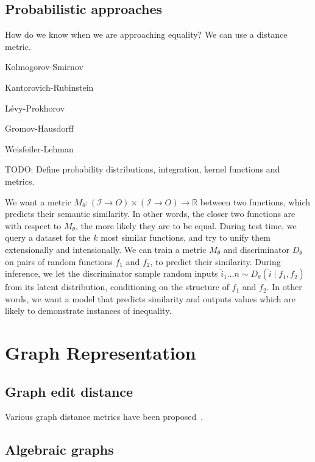 \documentclass[11pt]{article}
\begin{document}
    \subsection{Probabilistic approaches}

    How do we know when we are approaching equality? We can use a distance metric.

    Kolmogorov-Smirnov

    Kantorovich-Rubinstein

    L\'evy-Prokhorov

    Gromov-Hausdorff

    Weisfeiler-Lehman

    TODO: Define probability distributions, integration, kernel functions and metrics.

    We want a metric $M_\theta: (\mathcal{I}\rightarrow{O}) \times (\mathcal{I}\rightarrow{O})\rightarrow \mathbb{R}$ between two functions, which predicts their semantic similarity. In other words, the closer two functions are with respect to $M_\theta$, the more likely they are to be equal. During test time, we query a dataset for the $k$ most similar functions, and try to unify them extensionally and intensionally. We can train a metric $M_\theta$ and discriminator $D_\theta$ on pairs of random functions $f_1$ and $f_2$, to predict their similarity. During inference, we let the discriminator sample random inputs $\hat i_1 \ldots n \sim D_\theta(\hat i \mid f_1, f_2)$ from its latent distribution, conditioning on the structure of $f_1$ and $f_2$. In other words, we want a model that predicts similarity and outputs values which are likely to demonstrate instances of inequality.

    \section{Graph Representation}\label{sec:graphs}

    \subsection{Graph edit distance}


    Various graph distance metrics have been proposed~\citet{sanfeliu1983distance}.

    \subsection{Algebraic graphs}
\end{document}
